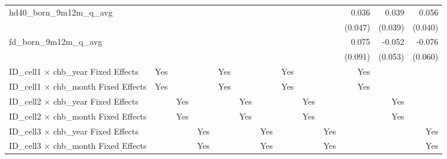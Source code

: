 \begin{tabular}{lrrrrrrrrrrrr}
hd40\_born\_9m12m\_q\_avg                   &              &              &              &              &              &              &              &              &              &        0.036 &        0.039 &        0.056 \\ 
                                            &              &              &              &              &              &              &              &              &              &      (0.047) &      (0.039) &      (0.040) \\ 
fd\_born\_9m12m\_q\_avg                     &              &              &              &              &              &              &              &              &              &        0.075 &       -0.052 &       -0.076 \\ 
                                            &              &              &              &              &              &              &              &              &              &      (0.091) &      (0.053) &      (0.060) \\ 
\midrule
ID\_cell1 $\times$ chb\_year Fixed Effects  &          Yes &              &              &          Yes &              &              &          Yes &              &              &          Yes &              &              \\ 
ID\_cell1 $\times$ chb\_month Fixed Effects &          Yes &              &              &          Yes &              &              &          Yes &              &              &          Yes &              &              \\ 
ID\_cell2 $\times$ chb\_year Fixed Effects  &              &          Yes &              &              &          Yes &              &              &          Yes &              &              &          Yes &              \\ 
ID\_cell2 $\times$ chb\_month Fixed Effects &              &          Yes &              &              &          Yes &              &              &          Yes &              &              &          Yes &              \\ 
ID\_cell3 $\times$ chb\_year Fixed Effects  &              &              &          Yes &              &              &          Yes &              &              &          Yes &              &              &          Yes \\ 
ID\_cell3 $\times$ chb\_month Fixed Effects &              &              &          Yes &              &              &          Yes &              &              &          Yes &              &              &          Yes \\ 

\end{tabular}
